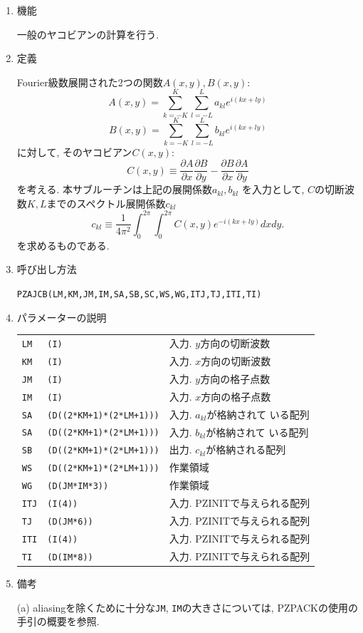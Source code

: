 \documentclass[a4j,fleqn]{jarticle}
\begin{document}
\begin{enumerate}

\item 機能 

一般のヤコビアンの計算を行う.

\item 定義

Fourier級数展開された2つの関数$A(x,y),B(x,y)$:
\[
A(x,y)=\sum^K_{k=-K}\sum^L_{l=-L}a_{kl}e^{i(kx+ly)}
\]
\[
B(x,y)=\sum^K_{k=-K}\sum^L_{l=-L}b_{kl}e^{i(kx+ly)}
\]
に対して, そのヤコビアン$C(x,y)$:
\[
C(x,y)\equiv
\frac{\partial A}{\partial x}\frac{\partial B}{\partial y}
-\frac{\partial B}{\partial x}\frac{\partial A}{\partial y}
\]
を考える. 本サブルーチンは上記の展開係数$a_{kl},b_{kl}$
を入力として,
$C$の切断波数$K,L$までのスペクトル展開係数$c_{kl}$
\begin{equation}
c_{kl}\equiv\frac1{4\pi^2}\int^{2\pi}_0\int^{2\pi}_0
C(x,y)e^{-i(kx+ly)}dxdy.
\end{equation}
を求めるものである. 

\item 呼び出し方法 

{\tt PZAJCB(LM,KM,JM,IM,SA,SB,SC,WS,WG,ITJ,TJ,ITI,TI)}
  
\item パラメーターの説明

\begin{tabular}{lll}
{\tt LM} & {\tt (I)} & 入力. $y$方向の切断波数\\
{\tt KM} & {\tt (I)} & 入力. $x$方向の切断波数\\
{\tt JM} & {\tt (I)} & 入力. $y$方向の格子点数\\
{\tt IM} & {\tt (I)} & 入力. $x$方向の格子点数\\
{\tt SA} & {\tt (D((2*KM+1)*(2*LM+1)))} & 入力. $a_{kl}$が格納されて
いる配列\\
{\tt SA} & {\tt (D((2*KM+1)*(2*LM+1)))} & 入力. $b_{kl}$が格納されて
いる配列\\
{\tt SB} & {\tt (D((2*KM+1)*(2*LM+1)))} & 出力. 
$c_{kl}$が格納される配列\\
{\tt WS} & {\tt (D((2*KM+1)*(2*LM+1)))} & 作業領域\\
{\tt WG} & {\tt (D(JM*IM*3))} & 作業領域\\
{\tt ITJ} & {\tt (I(4))} & 入力. PZINITで与えられる配列\\
{\tt TJ} & {\tt (D(JM*6))} & 入力. PZINITで与えられる配列\\
{\tt ITI} & {\tt (I(4))} & 入力. PZINITで与えられる配列\\
{\tt TI} & {\tt (D(IM*8))} & 入力. PZINITで与えられる配列
\end{tabular}

\item 備考

(a) aliasingを除くために十分な{\tt JM}, {\tt IM}の大きさについては,
PZPACKの使用の手引の概要を参照.

\end{enumerate}
\end{document}

